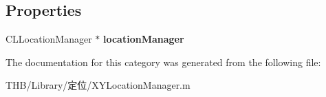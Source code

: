 \subsection*{Properties}
\begin{DoxyCompactItemize}
\item 
\mbox{\label{category_x_y_location_manager_07_08_a86f1ce3bb66f54e28c69d63ee1396749}} 
C\+L\+Location\+Manager $\ast$ {\bfseries location\+Manager}
\end{DoxyCompactItemize}


The documentation for this category was generated from the following file\+:\begin{DoxyCompactItemize}
\item 
T\+H\+B/\+Library/定位/X\+Y\+Location\+Manager.\+m\end{DoxyCompactItemize}
